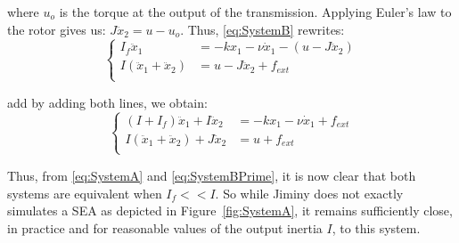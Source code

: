 \documentclass[a4paper,10pt]{article}
\begin{document}
where $u_o$ is the torque at the output of the transmission. Applying Euler's law to the rotor gives us: $J \ddot{x}_2 = u - u_o$. Thus, \eqref{eq:SystemB} rewrites:
\begin{equation}
\left\{ 
\begin{aligned}
I_f \ddot{x}_1 &= - k x_1 - \nu \dot{x}_1 - (u - J \ddot{x}_2)\\
I (\ddot{x}_1 + \ddot{x}_2)  &= u -J \ddot{x}_2 + f_{ext} \\
\end{aligned}
\right.
\end{equation}

add by adding both lines, we obtain:
\begin{equation}
\left\{ 
\begin{aligned}
(I + I_f) \ddot{x}_1 + I \ddot{x}_2 &= - k x_1 - \nu \dot{x}_1 + f_{ext}\\
I (\ddot{x}_1 + \ddot{x}_2) + J \ddot{x}_2 &= u + f_{ext} \\
\end{aligned}
\right.
\label{eq:SystemBPrime}
\end{equation}

Thus, from \eqref{eq:SystemA} and \eqref{eq:SystemBPrime}, it is now clear that both systems are equivalent when $I_f << I$. So while Jiminy does not exactly simulates a SEA as depicted in Figure~\ref{fig:SystemA}, it remains sufficiently close, in practice and for reasonable values of the output inertia $I$, to this system.
\end{document}
